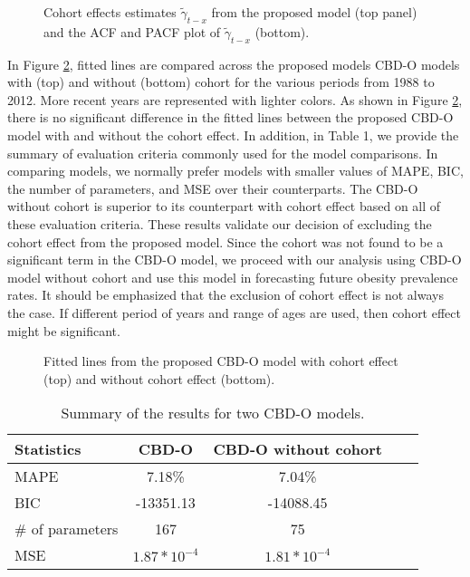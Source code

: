 \documentclass[11pt,letterpaper]{article}
\numberwithin{equation}{section}
\begin{document}
\begin{figure}
\begin{center}
{}
{}
\caption{\label{fig:plot3}Cohort effects estimates $\tilde \gamma_{t-x}$ from the proposed model (top panel) and the ACF and PACF plot of $\tilde \gamma_{t-x}$ (bottom).}
\end{center}
\end{figure}


In Figure \ref{fig:f4}, fitted lines are compared across the proposed models CBD-O models with (top) and without (bottom) cohort for the various periods from 1988 to 2012. More recent years are represented with lighter colors. As shown in Figure \ref{fig:f4}, there is no significant difference in the fitted lines between the proposed CBD-O model with and without the cohort effect. In addition, in Table 1, we provide the summary of evaluation criteria commonly used for the model comparisons. In comparing models, we normally prefer models with smaller values of MAPE, BIC, the number of parameters, and MSE over their counterparts. The CBD-O without cohort is superior to its counterpart with cohort effect based on all of these evaluation criteria.
These results validate our decision of excluding the cohort effect from the proposed model. Since the cohort was not found to be a significant term in the CBD-O model,  we proceed with our analysis using CBD-O model without cohort and use this model in forecasting future obesity prevalence rates. It should be emphasized that the exclusion of cohort effect is not always the case. If different period of years and range of ages are used, then cohort effect might be significant.

\begin{figure}
\begin{center}
{}
{}
\caption{\label{fig:f4} Fitted lines from the proposed CBD-O model with cohort effect (top) and without cohort effect (bottom).}
\end{center}
\end{figure}

\begin{table}[]
\centering
\caption{Summary of the results for two CBD-O models.}
\label{mixtures}
\begin{tabular}{lcccc}
\hline\hline
Statistics & CBD-O & CBD-O without cohort \\
\hline
MAPE  & 7.18\%	& 7.04\%  \\
BIC & -13351.13 &   -14088.45 \\
\# of parameters &167 & 75\\
MSE & $1.87*10^{-4}$ &  $1.81*10^{-4}$\\
\hline\hline
\end{tabular}
\end{table}
\end{document}
